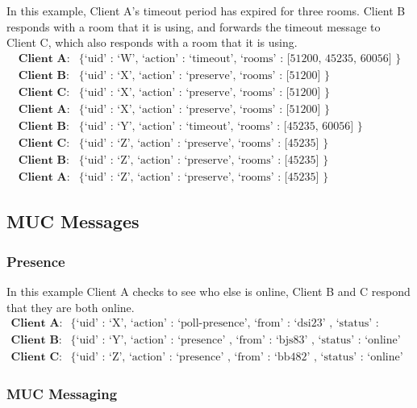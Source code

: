 \documentclass{article}
\begin{document}
In this example, Client A's timeout period has expired for three rooms. Client B
responds with a room that it is using, and forwards the timeout message to
Client C, which also responds with a room that it is using.
\begin{align*}
\textbf{Client A}:& \text{\{ `uid' : `W', `action' : `timeout', `rooms' : [51200,
45235, 60056] \}}\\
\textbf{Client B}:& \text{\{ `uid' : `X', `action' : `preserve', `rooms' :
[51200] \}}\\
\textbf{Client C}:& \text{\{ `uid' : `X', `action' : `preserve', `rooms' :
[51200] \}}\\
\textbf{Client A}:& \text{\{ `uid' : `X', `action' : `preserve', `rooms' :
[51200] \}}\\
\textbf{Client B}:& \text{\{ `uid' : `Y', `action' : `timeout', `rooms' : [45235,
60056] \}}\\
\textbf{Client C}:& \text{\{ `uid' : `Z', `action' : `preserve', `rooms' :
[45235] \}}\\
\textbf{Client B}:& \text{\{ `uid' : `Z', `action' : `preserve', `rooms' :
[45235] \}}\\
\textbf{Client A}:& \text{\{ `uid' : `Z', `action' : `preserve', `rooms' :
[45235] \}}
\end{align*}

\subsection{MUC Messages}
\subsubsection{Presence}

In this example Client A checks to see who else is online, Client B and C respond
that they are both online.
\begin{align*}
\textbf{Client A}:& \text{\{ `uid' : `X', `action' : `poll-presence', `from' :
`dsi23' , `status' : `online' \}} \\
\textbf{Client B}:& \text{\{ `uid' : `Y', `action' : `presence' , `from' :
`bjs83' , `status' : `online' \}} \\
\textbf{Client C}:& \text{\{ `uid' : `Z', `action' : `presence' , `from' :
`bb482' , `status' : `online' \}} 
\end{align*}

\subsubsection{MUC Messaging}
\end{document}
